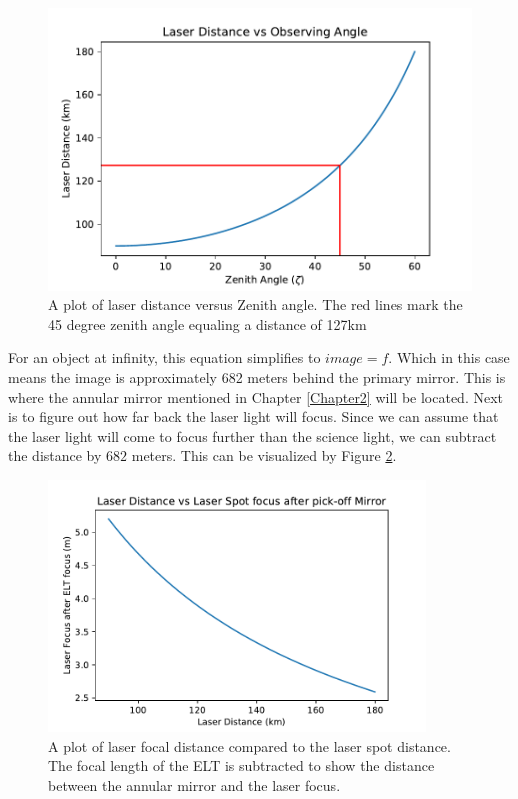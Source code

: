 \begin{figure}[h!]
\centering
\includegraphics[width=10 cm]{Figures/las_dist.pdf}
\caption{A plot of laser distance versus Zenith angle.  The red lines mark the 45 degree zenith angle equaling a distance of 127km}
\label{fig:laser_dist}
\end{figure}

For an object at infinity, this equation simplifies to $image = f$.  Which in this
case means the image is approximately 682 meters behind the primary mirror.  This is
where the annular mirror mentioned in Chapter \ref{Chapter2} will be located.  Next
is to figure out how far back the laser light will focus.  Since we can assume that
the laser light will come to focus further than the science light, we can subtract
the distance by $682$ meters.  This can be visualized by Figure
\ref{fig:laser_focus}.

\begin{figure}[h!]
\centering
\includegraphics[width=10cm]{Figures/Laser_focus_vs_Laser_dist.pdf}
\caption{A plot of laser focal distance compared to the laser spot distance.  The focal length of the ELT is subtracted to show the distance between the annular mirror and the laser focus.}
\label{fig:laser_focus}
\end{figure}


